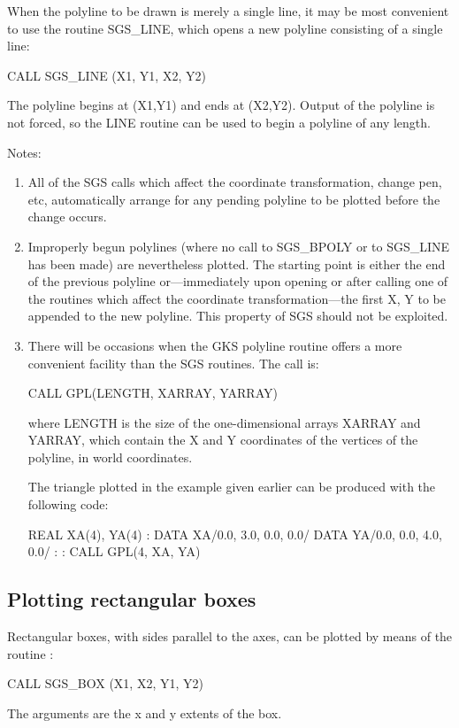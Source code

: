 \documentclass[11pt]{starlink}
\begin{document}
When the polyline to be drawn is merely a single line, it may be most
convenient to use the routine SGS\_LINE, which opens a new polyline
consisting of a single line:
\begin{terminalv}
CALL SGS_LINE (X1, Y1, X2, Y2)
\end{terminalv}
The polyline begins at (X1,Y1) and ends at (X2,Y2).  Output
of the polyline is not forced, so the LINE routine
can be used to begin a polyline of any length.

Notes:
\begin{enumerate}
\item All of the SGS calls which affect the coordinate transformation,
change pen, etc,
automatically arrange for any pending
polyline to be plotted before the change occurs.
\item Improperly begun polylines (where no call to SGS\_BPOLY or to SGS\_LINE
has been made) are nevertheless plotted.  The starting point
is either the end of the previous polyline or---immediately upon
opening or after calling one of the routines which affect the
coordinate transformation---the first X, Y to be appended to
the new polyline.  This property of SGS should not be exploited.
\item There will be occasions when the GKS polyline routine
offers a more convenient facility than the SGS
routines.  The call is:
\begin{terminalv}
CALL GPL(LENGTH, XARRAY, YARRAY)
\end{terminalv}
where LENGTH is the size of the one-dimensional arrays XARRAY and
YARRAY, which contain the X and Y coordinates of the vertices
of the polyline, in world coordinates.

The triangle plotted in the example given earlier can be produced
with the following code:
\begin{terminalv}
REAL XA(4), YA(4)
 :
DATA XA/0.0, 3.0, 0.0, 0.0/
DATA YA/0.0, 0.0, 4.0, 0.0/
 :
 :
CALL GPL(4, XA, YA)
\end{terminalv}
\end{enumerate}

\subsection {Plotting rectangular boxes}
Rectangular boxes, with sides parallel to the axes, can be plotted
by means of the routine :
\begin{terminalv}
 CALL SGS_BOX (X1, X2, Y1, Y2)
\end{terminalv}
The arguments are the x and y extents of the box.
\end{document}
